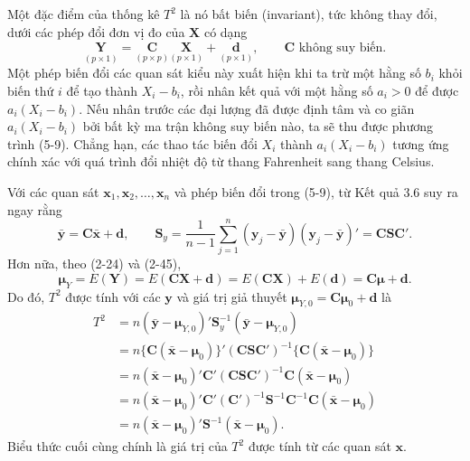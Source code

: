 Một đặc điểm của thống kê \(T^2\) là nó bất biến (invariant), tức không thay đổi,
dưới các phép đổi đơn vị đo của \(\mathbf{X}\) có dạng
\begin{equation}
  \underset{(p\times1)}{\mathbf{Y}}
  = \underset{(p\times p)}{\mathbf{C}}
    \underset{(p\times1)}{\mathbf{X}}
  + \underset{(p\times1)}{\mathbf{d}},
  \qquad \mathbf{C} \text{ không suy biến.}
\end{equation}
Một phép biến đổi các quan sát kiểu này xuất hiện khi ta trừ một hằng số \(b_i\)
khỏi biến thứ \(i\) để tạo thành \(X_i-b_i\), rồi nhân kết quả với một hằng số
\(a_i>0\) để được \(a_i(X_i-b_i)\). Nếu nhân trước các đại lượng đã được định tâm
và co giãn \(a_i(X_i-b_i)\) bởi bất kỳ ma trận không suy biến nào, ta sẽ thu được
phương trình (5-9). Chẳng hạn, các thao tác biến đổi \(X_i\) thành
\(a_i(X_i-b_i)\) tương ứng chính xác với quá trình đổi nhiệt độ từ thang Fahrenheit
sang thang Celsius.

Với các quan sát \(\mathbf{x}_1,\mathbf{x}_2,\ldots,\mathbf{x}_n\) và phép biến đổi
trong (5-9), từ Kết quả 3.6 suy ra ngay rằng
\[
  \bar{\mathbf{y}} = \mathbf{C}\bar{\mathbf{x}} + \mathbf{d},
  \qquad
  \mathbf{S}_y
  = \frac{1}{n-1}\sum_{j=1}^{n}
    (\mathbf{y}_j-\bar{\mathbf{y}})(\mathbf{y}_j-\bar{\mathbf{y}})'
  = \mathbf{C}\mathbf{S}\mathbf{C}'.
\]
Hơn nữa, theo (2-24) và (2-45),
\[
  \boldsymbol{\mu}_Y
  = E(\mathbf{Y})
  = E(\mathbf{C}\mathbf{X}+\mathbf{d})
  = E(\mathbf{C}\mathbf{X})+E(\mathbf{d})
  = \mathbf{C}\boldsymbol{\mu}+\mathbf{d}.
\]
Do đó, \(T^2\) được tính với các \(\mathbf{y}\) và giá trị giả thuyết
\(\boldsymbol{\mu}_{Y,0}=\mathbf{C}\boldsymbol{\mu}_0+\mathbf{d}\) là
\[
\begin{aligned}
  T^2
  &= n(\bar{\mathbf{y}}-\boldsymbol{\mu}_{Y,0})'
     \mathbf{S}_y^{-1}
     (\bar{\mathbf{y}}-\boldsymbol{\mu}_{Y,0}) \\
  &= n\{\mathbf{C}(\bar{\mathbf{x}}-\boldsymbol{\mu}_0)\}'
     (\mathbf{C}\mathbf{S}\mathbf{C}')^{-1}
     \{\mathbf{C}(\bar{\mathbf{x}}-\boldsymbol{\mu}_0)\} \\
  &= n(\bar{\mathbf{x}}-\boldsymbol{\mu}_0)'
     \mathbf{C}'(\mathbf{C}\mathbf{S}\mathbf{C}')^{-1}
     \mathbf{C}(\bar{\mathbf{x}}-\boldsymbol{\mu}_0) \\
  &= n(\bar{\mathbf{x}}-\boldsymbol{\mu}_0)'
     \mathbf{C}'(\mathbf{C}')^{-1}\mathbf{S}^{-1}\mathbf{C}^{-1}\mathbf{C}
     (\bar{\mathbf{x}}-\boldsymbol{\mu}_0) \\
  &= n(\bar{\mathbf{x}}-\boldsymbol{\mu}_0)'
     \mathbf{S}^{-1}
     (\bar{\mathbf{x}}-\boldsymbol{\mu}_0).
\end{aligned}
\]
Biểu thức cuối cùng chính là giá trị của \(T^2\) được tính từ các quan sát
\(\mathbf{x}\).
